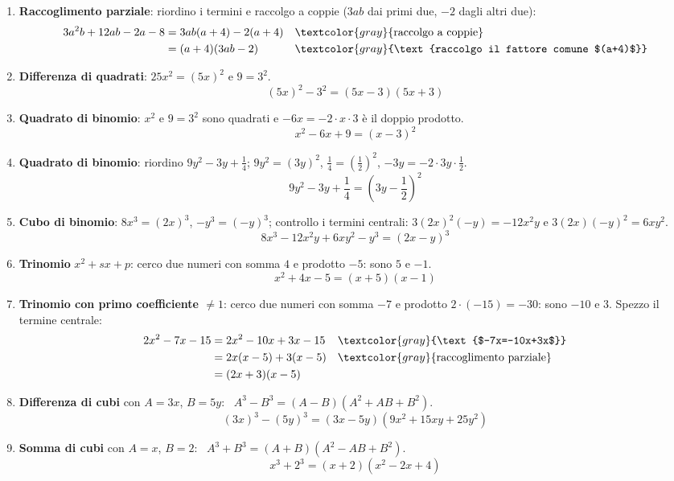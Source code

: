 \begin{question}[ID=1.1, subtitle={Scomposizione di polinomi — serie 1}, tags={scomposizione, prodotti notevoli}, difficulty=facile]
\begin{explanation}
\begin{enumerate}
    \item \textbf{Raccoglimento parziale}: riordino i termini e raccolgo a coppie ($3ab$ dai primi due, $-2$ dagli altri due):
    \[\begin{aligned}
    3a^2b+12ab-2a-8 &= 3ab(a+4)-2(a+4) && \textcolor{gray}{\text{raccolgo a coppie}}\\
    &= (a+4)(3ab-2) && \textcolor{gray}{\text{raccolgo il fattore comune $(a+4)$}}
    \end{aligned}\]
    \item \textbf{Differenza di quadrati}: $25x^2=(5x)^2$ e $9=3^2$.
    \[ (5x)^2-3^2=(5x-3)(5x+3) \]
    \item \textbf{Quadrato di binomio}: $x^2$ e $9=3^2$ sono quadrati e $-6x=-2\cdot x\cdot3$ è il doppio prodotto.
    \[ x^2-6x+9=(x-3)^2 \]
    \item \textbf{Quadrato di binomio}: riordino $9y^2-3y+\tfrac14$; $9y^2=(3y)^2$, $\tfrac14=\left(\tfrac12\right)^2$, $-3y=-2\cdot3y\cdot\tfrac12$.
    \[ 9y^2-3y+\dfrac14=\left(3y-\dfrac12\right)^2 \]
    \item \textbf{Cubo di binomio}: $8x^3=(2x)^3$, $-y^3=(-y)^3$; controllo i termini centrali: $3(2x)^2(-y)=-12x^2y$ e $3(2x)(-y)^2=6xy^2$.
    \[ 8x^3-12x^2y+6xy^2-y^3=(2x-y)^3 \]
    \item \textbf{Trinomio} $x^2+sx+p$: cerco due numeri con somma $4$ e prodotto $-5$: sono $5$ e $-1$.
    \[ x^2+4x-5=(x+5)(x-1) \]
    \item \textbf{Trinomio con primo coefficiente $\neq1$}: cerco due numeri con somma $-7$ e prodotto $2\cdot(-15)=-30$: sono $-10$ e $3$. Spezzo il termine centrale:
    \[\begin{aligned}
    2x^2-7x-15 &= 2x^2-10x+3x-15 && \textcolor{gray}{\text{$-7x=-10x+3x$}}\\
    &= 2x(x-5)+3(x-5) && \textcolor{gray}{\text{raccoglimento parziale}}\\
    &= (2x+3)(x-5)
    \end{aligned}\]
    \item \textbf{Differenza di cubi} con $A=3x$, $B=5y$: \ $A^3-B^3=(A-B)(A^2+AB+B^2)$.
    \[ (3x)^3-(5y)^3=(3x-5y)(9x^2+15xy+25y^2) \]
    \item \textbf{Somma di cubi} con $A=x$, $B=2$: \ $A^3+B^3=(A+B)(A^2-AB+B^2)$.
    \[ x^3+2^3=(x+2)(x^2-2x+4) \]
\end{enumerate}
\end{explanation}
\end{question}


